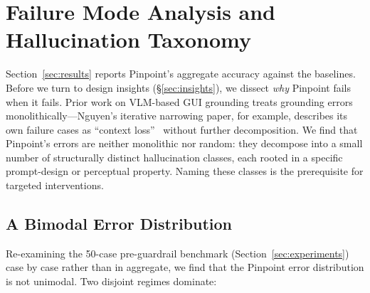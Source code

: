 
\section{Failure Mode Analysis and Hallucination Taxonomy}
\label{sec:taxonomy}

Section~\ref{sec:results} reports Pinpoint's aggregate accuracy against
the baselines.  Before we turn to design insights
(§\ref{sec:insights}), we dissect \emph{why} Pinpoint fails when it
fails.  Prior work on VLM-based GUI grounding treats grounding errors
monolithically---Nguyen's iterative narrowing paper, for example,
describes its own failure cases as ``context loss''~\cite{nguyen2024iterativenarrowing}
without further decomposition.  We find that Pinpoint's errors are
neither monolithic nor random: they decompose into a small number of
structurally distinct hallucination classes, each rooted in a specific
prompt-design or perceptual property.  Naming these classes is the
prerequisite for targeted interventions.

\subsection{A Bimodal Error Distribution}
\label{sec:taxonomy-bimodal}

Re-examining the 50-case pre-guardrail benchmark (Section~\ref{sec:experiments})
case by case rather than in aggregate, we find that the Pinpoint error
distribution is not unimodal.  Two disjoint regimes dominate:

